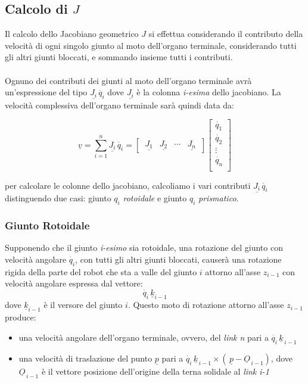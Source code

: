 \subsection{Calcolo di $J$}
Il calcolo dello Jacobiano geometrico $J$ si effettua considerando il contributo della velocità di ogni singolo giunto al moto dell'organo terminale, considerando tutti gli altri giunti bloccati, e sommando insieme tutti i contributi.

\paragraph{}
Ognuno dei contributi dei giunti al moto dell'organo terminale avrà un'espressione del tipo $\underline{J_i}\,\dot{q_i}$ dove $\underline{J_i}$ è la colonna \emph{i-esima} dello jacobiano. La velocità complessiva dell'organo terminale sarà quindi data da:

\begin{equation}
	\underline{v} = \sum_{i = 1}^{n} \underline{J_i}\,\dot{q_i} = 
	\begin{bmatrix}
		\,\underline{J_1} & \underline{J_2} & \cdots & \underline{J_n}\,
	\end{bmatrix}
	\begin{bmatrix}
		\dot{q_1} \\
		\dot{q_2} \\
		\vdots \\
		\dot{q_n}\\
	\end{bmatrix}
\end{equation}

per calcolare le colonne dello jacobiano, calcoliamo i vari contributi $\underline{J_i}\,\dot{q_i}$ distinguendo due casi: giunto $q_i$ \emph{rotoidale} e giunto $q_i$ \emph{prismatico}.

\subsubsection{Giunto Rotoidale}
Supponendo che il giunto \emph{i-esimo} sia rotoidale, una rotazione del giunto con velocità angolare $\dot{q_i}$, con tutti gli altri giunti bloccati, causerà una rotazione rigida della parte del robot che sta a valle del giunto $i$ attorno all'asse $z_{i-1}$ con velocità angolare espressa dal vettore: 
\begin{equation}
	\dot{q_i}\,\underline{k}_{i-1} 
\end{equation}
dove $\underline{k}_{i-1}$ è il versore del giunto $i$. Questo moto di rotazione attorno all'asse $z_{i-1}$ produce:
\begin{itemize}
	\item una velocità angolare dell'organo terminale, ovvero, del \emph{link n} pari a $\dot{q_i}\,\underline{k}_{\,i-1}$
	\item una velocità di traslazione del punto $\underline{p}$ pari a $\dot{q_i}\,\underline{k}_{\,i-1} \times (\,\underline{p} - \underline{O}_{\,i-1})$, dove $\underline{O}_{\,i-1}$ è il vettore posizione dell'origine della terna solidale al \emph{link i-1}
\end{itemize}

